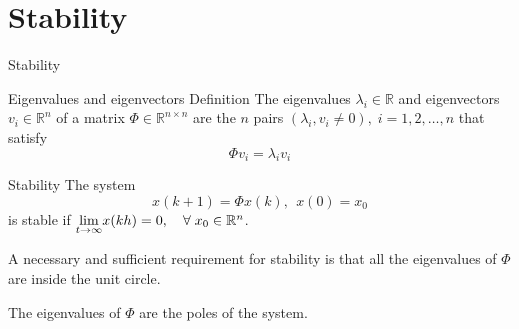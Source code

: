 \documentclass[presentation,aspectratio=1610]{beamer}
\begin{document}
\section{Stability}
\label{sec:org3e7227a}
\begin{frame}[label={sec:org68f96c3}]{Stability}
\end{frame}
\begin{frame}[label={sec:org6d21b1f}]{Eigenvalues and eigenvectors}
\alert{Definition} The eigenvalues \(\lambda_i  \in \mathbb{R}\) and eigenvectors \(v_i \in \mathbb{R}^n\) of a matrix \(\Phi \in \mathbb{R}^{n\times{}n}\) are the \(n\) pairs \((\lambda_i, v_i \neq 0 ), \; i=1,2,\ldots,n\) that satisfy
\[ \Phi v_i = \lambda_i v_i \]
\end{frame}

\begin{frame}[label={sec:orgd9a48bb}]{Stability}
The system
\begin{equation*}
x(k+1)=\Phi x(k), \ \ x(0)=x_0
\end{equation*}
is \alert{stable} if  \(\underset{t\to\infty}{\lim}x(kh)=0, \quad \forall\;  x_0\in\Bbb{R}^n\).

A necessary and sufficient requirement for stability is that \alert{all the eigenvalues of \(\Phi\) are inside the unit circle.}

The \alert{eigenvalues} of \(\Phi\) are the  \alert{poles} of the system.
\end{frame}
\end{document}
